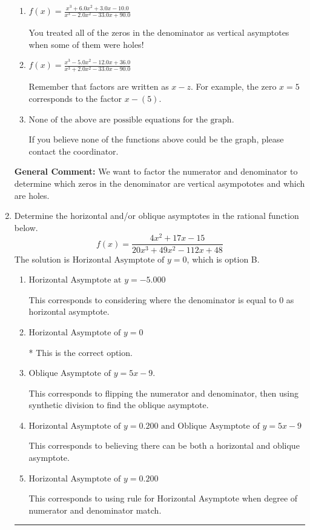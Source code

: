 \documentclass{extbook}[14pt]
\newcommand{\litem}[1]{\item #1

\rule{\textwidth}{0.4pt}}
\begin{document}
\begin{enumerate}
{\begin{enumerate}[label=\Alph*.]
You treated all of the zeros in the denominator as vertical asmptotes when some of them were holes and wrote factors as $x+z$.
\item \( f(x)=\frac{x^{3} +6.0 x^{2} +3.0 x -10.0}{x^{3} -2.0 x^{2} -33.0 x + 90.0} \)

You treated all of the zeros in the denominator as vertical asymptotes when some of them were holes!
\item \( f(x)=\frac{x^{3} -5.0 x^{2} -12.0 x + 36.0}{x^{3} +2.0 x^{2} -33.0 x -90.0} \)

Remember that factors are written as $x-z$. For example, the zero $x=5$ corresponds to the factor $x-(5)$.
\item \( \text{None of the above are possible equations for the graph.} \)

If you believe none of the functions above could be the graph, please contact the coordinator.
\end{enumerate}

\textbf{General Comment:} We want to factor the numerator and denominator to determine which zeros in the denominator are vertical asympototes and which are holes.
}
\litem{
Determine the horizontal and/or oblique asymptotes in the rational function below.
\[ f(x) = \frac{4x^{2} +17 x -15}{20x^{3} +49 x^{2} -112 x + 48} \]The solution is \( \text{Horizontal Asymptote of } y = 0 \), which is option B.\begin{enumerate}[label=\Alph*.]
\item \( \text{Horizontal Asymptote at } y = -5.000 \)

This corresponds to considering where the denominator is equal to 0 as horizontal asymptote.
\item \( \text{Horizontal Asymptote of } y = 0 \)

* This is the correct option.
\item \( \text{Oblique Asymptote of } y = 5x -9. \)

This corresponds to flipping the numerator and denominator, then using synthetic division to find the oblique asymptote.
\item \( \text{Horizontal Asymptote of } y = 0.200 \text{ and Oblique Asymptote of } y = 5x -9 \)

This corresponds to believing there can be both a horizontal and oblique asymptote.
\item \( \text{Horizontal Asymptote of } y = 0.200  \)

This corresponds to using rule for Horizontal Asymptote when degree of numerator and denominator match.
\end{enumerate}

}
\end{enumerate}
\end{document}
